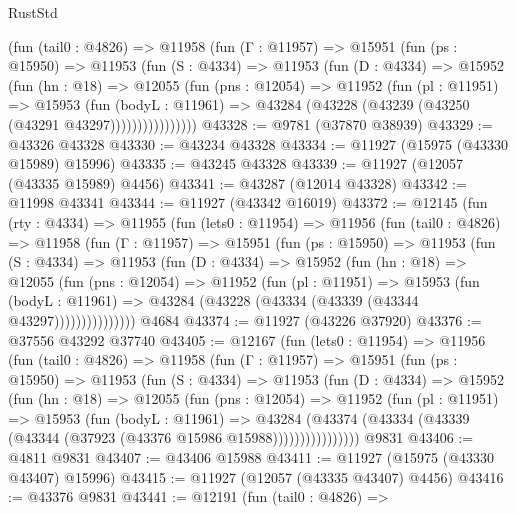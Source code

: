 \begin{lexlean}{RustStd}
\begin{coremodule}
          (fun (tail0 : @4826) =>
          @11958
            (fun (Γ : @11957) =>
            @15951
              (fun (ps : @15950) =>
              @11953
                (fun (S : @4334) =>
                @11953
                  (fun (D : @4334) =>
                  @15952
                    (fun (hn : @18) =>
                    @12055
                      (fun (pns : @12054) =>
                      @11952
                        (fun (pl : @11951) =>
                        @15953
                          (fun (bodyL : @11961) =>
                          @43284 (@43228 (@43239 (@43250 (@43291 @43297))))))))))))))))
@43328 := @9781 (@37870 @38939)
@43329 := @43326 @43328
@43330 := @43234 @43328
@43334 := @11927 (@15975 (@43330 @15989) @15996)
@43335 := @43245 @43328
@43339 := @11927 (@12057 (@43335 @15989) @4456)
@43341 := @43287 (@12014 @43328)
@43342 := @11998 @43341
@43344 := @11927 (@43342 @16019)
@43372 := @12145
    (fun (rty : @4334) =>
    @11955
      (fun (lets0 : @11954) =>
      @11956
        (fun (tail0 : @4826) =>
        @11958
          (fun (Γ : @11957) =>
          @15951
            (fun (ps : @15950) =>
            @11953
              (fun (S : @4334) =>
              @11953
                (fun (D : @4334) =>
                @15952
                  (fun (hn : @18) =>
                  @12055
                    (fun (pns : @12054) =>
                    @11952
                      (fun (pl : @11951) =>
                      @15953
                        (fun (bodyL : @11961) =>
                        @43284 (@43228 (@43334 (@43339 (@43344 @43297)))))))))))))))
    @4684
@43374 := @11927 (@43226 @37920)
@43376 := @37556 @43292 @37740
@43405 := @12167
    (fun (lets0 : @11954) =>
    @11956
      (fun (tail0 : @4826) =>
      @11958
        (fun (Γ : @11957) =>
        @15951
          (fun (ps : @15950) =>
          @11953
            (fun (S : @4334) =>
            @11953
              (fun (D : @4334) =>
              @15952
                (fun (hn : @18) =>
                @12055
                  (fun (pns : @12054) =>
                  @11952
                    (fun (pl : @11951) =>
                    @15953
                      (fun (bodyL : @11961) =>
                      @43284
                        (@43374
                          (@43334 (@43339 (@43344 (@37923 (@43376 @15986 @15988))))))))))))))))
    @9831
@43406 := @4811 @9831
@43407 := @43406 @15988
@43411 := @11927 (@15975 (@43330 @43407) @15996)
@43415 := @11927 (@12057 (@43335 @43407) @4456)
@43416 := @43376 @9831
@43441 := @12191
    (fun (tail0 : @4826) =>

\end{coremodule}
\end{lexlean}
